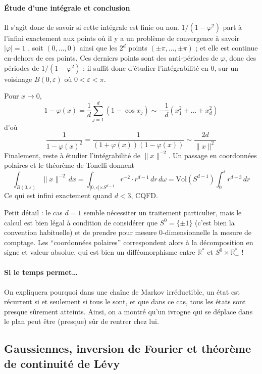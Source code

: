 \documentclass[a4paper, 11pt]{article}
\def\R{\mathbb{R}}
\def\Vol{\mathrm{Vol}}
\begin{document}
\paragraph{Étude d'une intégrale et conclusion} Il s'agit donc de savoir si
cette intégrale est finie ou non. $1/(1-\varphi^2)$ part à l'infini exactement
aux points où il y a un problème de convergence à savoir $|\varphi| = 1$ , soit
$(0,\ldots,0)$ ainsi que les $2^d$ points $(\pm \pi, \ldots, \pm \pi)$ ; et elle
est continue en-dehors de ces points. Ces derniers points sont des anti-périodes
de $\varphi$, donc des périodes de $1/(1-\varphi^2)$ : il suffit donc d'étudier
l'intégrabilité en 0, sur un voisinage $B(0,\varepsilon)$ où $0 < \varepsilon <
\pi$.

Pour $x \to 0$,
\[ 1 - \varphi(x) = \frac{1}{d} \sum_{j=1}^d (1 - \cos x_j) \sim
  -\frac{1}{d}(x_1^2 + \ldots + x_d^2) \] d'où
\[\frac{1}{1 - \varphi(x)^2} = \frac{1}{(1 + \varphi(x))(1 - \varphi(x))} \sim
  \frac{2d}{\|x\|^2} \]
Finalement, reste à étudier l'intégrabilité de $\|x\|^{-2}$. Un passage en
coordonnées polaires et le théorème de Tonelli donnent
\[ \int_{B(0,\varepsilon)} \|x\|^{-2}\,dx = \int_{]0,\varepsilon[ \times S^{d-1}}
  r^{-2} \cdot r^{d-1}\,dr\,d\omega = \Vol(S^{d-1}) \int_0^\varepsilon
  r^{d-3}\,dr \]
Ce qui est infini exactement quand $d < 3$, CQFD.

Petit détail : le cas $d=1$ semble nécessiter un traitement particulier,
mais le calcul est bien légal à condition de considérer que $S^0 = \{\pm 1\}$
(c'est bien la convention habituelle) et de prendre pour mesure 0-dimensionnelle
la mesure de comptage. Les \enquote{coordonnées polaires} correspondent alors à
la décomposition en signe et valeur absolue, qui est bien un
difféomorphisme entre $\R^*$ et $S^0 \times \R_+^*$ !

\paragraph{Si le temps permet…} On expliquera pourquoi dans une chaîne de Markov
irréductible, un état est récurrent si et seulement si tous le sont, et que dans
ce cas, tous les états sont presque sûrement atteints. Ainsi, on a montré qu'un
ivrogne qui se déplace dans le plan peut être (presque) sûr de rentrer chez lui.

\newpage

\subsection{Gaussiennes, inversion de Fourier et théorème de continuité de Lévy}
\end{document}
